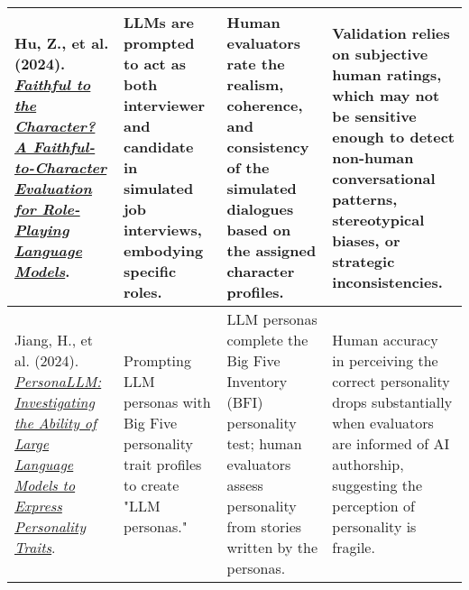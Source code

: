 {\begin{longtable}{| L{4.5cm} | L{3.5cm} | L{3.5cm} | L{3.5cm} |}
\\\hline
Hu, Z., et al. (2024). \href{https://arxiv.org/abs/2402.04049}{\textit{Faithful to the Character? A Faithful-to-Character Evaluation for Role-Playing Language Models}}. & LLMs are prompted to act as both interviewer and candidate in simulated job interviews, embodying specific roles. & Human evaluators rate the realism, coherence, and consistency of the simulated dialogues based on the assigned character profiles. & Validation relies on subjective human ratings, which may not be sensitive enough to detect non-human conversational patterns, stereotypical biases, or strategic inconsistencies.
\\\hline
Jiang, H., et al. (2024). \href{https://aclanthology.org/2024.findings-naacl.229/}{\textit{PersonaLLM: Investigating the Ability of Large Language Models to Express Personality Traits}}. & Prompting LLM personas with Big Five personality trait profiles to create "LLM personas." & LLM personas complete the Big Five Inventory (BFI) personality test; human evaluators assess personality from stories written by the personas. & Human accuracy in perceiving the correct personality drops substantially when evaluators are informed of AI authorship, suggesting the perception of personality is fragile.
\\\hline

\end{longtable}
} %